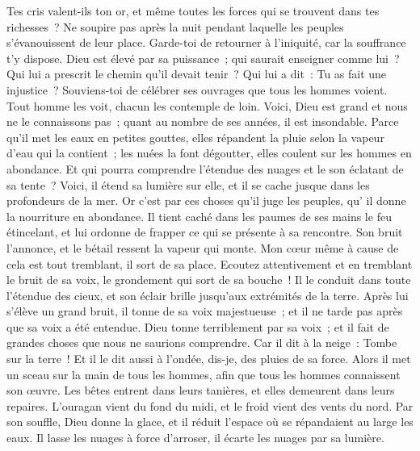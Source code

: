 \begin{multicols}{2}
Tes cris valent-ils ton or, et même toutes les forces qui se trouvent dans tes richesses~?
Ne soupire pas après la nuit pendant laquelle les peuples s'évanouissent de leur place.
Garde-toi de retourner à l'iniquité, car la souffrance t'y dispose.
Dieu est élevé par sa puissance~; qui saurait enseigner comme lui~?
Qui lui a prescrit le chemin qu'il devait tenir~? Qui lui a dit~: Tu as fait une injustice~?
Souviens-toi de célébrer ses ouvrages que tous les hommes voient.
Tout homme les voit, chacun les contemple de loin.
Voici, Dieu est grand et nous ne le connaissons pas~; quant au nombre de ses années, il est insondable.
Parce qu'il met les eaux en petites gouttes, elles répandent la pluie selon la vapeur d'eau qui la contient~;
les nuées la font dégoutter, elles coulent sur les hommes en abondance.
Et qui pourra comprendre l'étendue des nuages et le son éclatant de sa tente~?
Voici, il étend sa lumière sur elle, et il se cache jusque dans les profondeurs de la mer.
 Or c'est par ces choses qu'il juge les peuples, qu' il donne la nourriture en abondance.
 Il tient caché dans les paumes de ses mains le feu étincelant, et lui ordonne de frapper ce qui se présente à sa rencontre.
 Son bruit l'annonce, et le bétail ressent la vapeur qui monte.
\VerseOne{}Mon cœur même à cause de cela est tout tremblant, il sort de sa place.
Ecoutez attentivement et en tremblant le bruit de sa voix, le grondement qui sort de sa bouche~!
Il le conduit dans toute l'étendue des cieux, et son éclair brille jusqu'aux extrémités de la terre.
Après lui s'élève un grand bruit, il tonne de sa voix majestueuse~; et il ne tarde pas après que sa voix a été entendue.
Dieu tonne terriblement par sa voix~; et il fait de grandes choses que nous ne saurions comprendre.
Car il dit à la neige~: Tombe sur la terre~! Et il le dit aussi à l'ondée, dis-je, des pluies de sa force.
Alors il met un sceau sur la main de tous les hommes, afin que tous les hommes connaissent son œuvre.
Les bêtes entrent dans leurs tanières, et elles demeurent dans leurs repaires.
L'ouragan vient du fond du midi, et le froid vient des vents du nord.
Par son souffle, Dieu donne la glace, et il réduit l'espace où se répandaient au large les eaux.
Il lasse les nuages à force d'arroser, il écarte les nuages par sa lumière.

\end{multicols}
